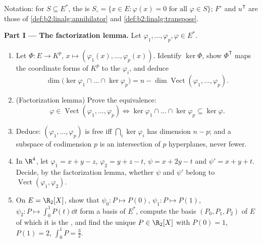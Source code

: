 \begin{problem}
\label{pb:b2:linalg:1}
Notation: for $S \subseteq E^*$, the \emph{} is
$S_\circ = \{x \in E : \varphi(x) = 0 \text{ for all } \varphi
\in S\}$;  $F^\circ$ and  $u^{\mathsf T}$
are those of \cref{def:b2:linalg:annihilator} and
\cref{def:b2:linalg:transpose}.

\medskip
\noindent\textbf{Part I --- The factorization lemma.} Let
$\varphi_1, \dots, \varphi_p, \varphi \in E^*$.
\begin{enumerate}
  \item Let $\Phi \colon E \to K^p$, $x \mapsto (\varphi_1(x),
        \dots, \varphi_p(x))$. Identify $\ker\Phi$, show
        $\Phi^{\mathsf T}$ maps the coordinate forms of $K^p$ to
        the $\varphi_i$, and deduce
        \[
        \dim \bigl(\ker\varphi_1 \cap \dots \cap
        \ker\varphi_p\bigr) = n - \dim
        \operatorname{Vect}(\varphi_1, \dots, \varphi_p).
        \]
  \item (Factorization lemma) Prove the equivalence:
        \[
        \varphi \in \operatorname{Vect}(\varphi_1, \dots,
        \varphi_p)
        \iff
        \ker\varphi_1 \cap \dots \cap \ker\varphi_p \subseteq
        \ker\varphi .
        \]
  \item Deduce: $(\varphi_1, \dots, \varphi_p)$ is free iff
        $\bigcap_i \ker\varphi_i$ has dimension $n - p$; and a
        subspace of codimension $p$ is an intersection of $p$
        hyperplanes, never fewer.
  \item In $\R^4$, let $\varphi_1 = x + y - z$, $\varphi_2 = y +
        z - t$, $\psi = x + 2y - t$ and $\psi' = x + y + t$.
        Decide, by the factorization lemma, whether $\psi$ and
        $\psi'$ belong to $\operatorname{Vect}(\varphi_1,
        \varphi_2)$.
  \item On $E = \R_2[X]$, show that $\psi_0 \colon P \mapsto
        P(0)$, $\psi_1 \colon P \mapsto P(1)$, $\psi_2 \colon P
        \mapsto \int_0^1 P(t)\dd t$ form a basis of $E^*$,
        compute the basis $(P_0, P_1, P_2)$ of $E$ of which it is
        the , and find the unique $P \in \R_2[X]$ with $P(0)
        = 1$, $P(1) = 2$, $\int_0^1 P = \frac32$.
\end{enumerate}


\end{problem}
